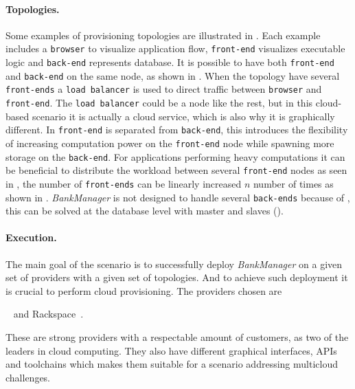 \paragraph{Topologies.}


Some examples of provisioning topologies are illustrated in .
Each example includes a \texttt{browser} to visualize application flow,
\texttt{front-end} visualizes executable logic and \texttt{back-end} represents database.
It is possible to have both \texttt{front-end} and \texttt{back-end} on the same node, 
as shown in .
When the topology have several \texttt{front-ends} a \texttt{load balancer} is used
to direct traffic between \texttt{browser} and \texttt{front-end}.
The \texttt{load balancer} could be a node like the rest, but in this cloud-based scenario
it is actually a cloud service, which is also why it is graphically different.
In  \texttt{front-end} is separated from \texttt{back-end},
this introduces the flexibility of increasing computation power on the \texttt{front-end} node while spawning more
storage on the \texttt{back-end}.
For applications performing heavy computations it can be beneficial to distribute the workload between several
\texttt{front-end} nodes as seen in , the number of \texttt{front-ends} can be linearly increased
$n$ number of times as shown in .
\emph{BankManager} is not designed to handle several \texttt{back-ends} because of ,
this can be solved at the database level with master and slaves ().

\paragraph{Execution.}

The main goal of the scenario is to successfully deploy \emph{BankManager}
on a given set of providers with a given set of topologies.
And to achieve such deployment it is crucial to perform cloud provisioning.
The providers chosen are
\begin{ii}
  \iitem {}~\cite{aws} and
  \iitem Rackspace~\cite{rackspace}.
\end{ii}
These are strong providers with a respectable amount of customers, as two of the leaders in cloud computing.
They also have different graphical interfaces, APIs and toolchains which makes them suitable
for a scenario addressing multicloud challenges.

